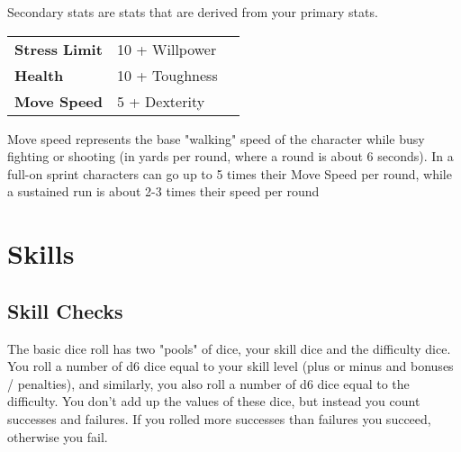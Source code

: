 Secondary stats are stats that are derived from your primary stats.

\begin{center}
    \noindent\begin{tabular}{@{}l l l@{}}
        \toprule
        \textbf{Stress Limit}  & 10 + Willpower\\
        \textbf{Health}        & 10 + Toughness\\
        \textbf{Move Speed}    & 5 + Dexterity\\
        \bottomrule
    \end{tabular}
\end{center}

Move speed represents the base "walking" speed of the character while busy fighting or shooting (in yards per round, where a round is about 6 seconds).
In a full-on sprint characters can go up to 5 times their Move Speed per round, while a sustained run is about 2-3 times their speed per round


\chapter{Skills}

\section{Skill Checks}

The basic dice roll has two "pools" of dice, your skill dice and the difficulty dice. 
You roll a number of d6 dice equal to your skill level (plus or minus and bonuses / penalties), and similarly, you also roll a number of d6 dice equal to the difficulty. You don't add up the values of these dice, but instead you count successes and failures.
If you rolled more successes than failures you succeed, otherwise you fail.


